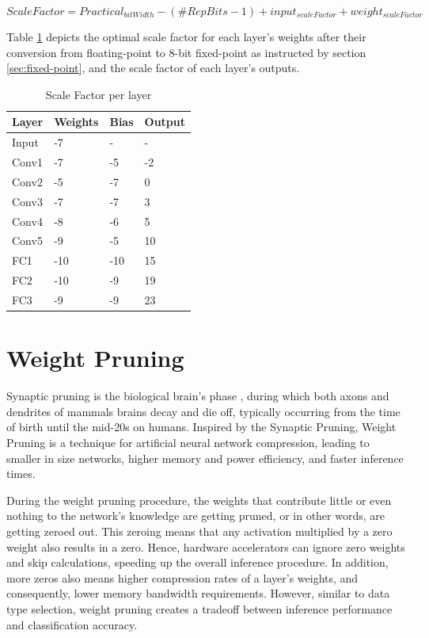 \begin{equation}
	\label{eqn:activations-scale-factor}
	ScaleFactor = Practical_{bitWidth} - (\#RepBits - 1) + input_{scaleFactor} + weight_{scaleFactor}
\end{equation}

Table \ref{tab:Scale-Factor-per-layer} depicts the optimal scale factor for each layer's weights after their conversion from floating-point to 8-bit fixed-point as instructed by section \ref{sec:fixed-point}, and the scale factor of each layer's outputs.

\begin{table}[H]
	\caption{Scale Factor per layer}
	\label{tab:Scale-Factor-per-layer}
	\centering
	\begin{tabular}{llll}
		\toprule
		\textbf{Layer} & \textbf{Weights} & \textbf{Bias} & \textbf{Output}\\
		\midrule
			Input & -7 & - & -\\
			Conv1 & -7 & -5 & -2\\
			Conv2 & -5 & -7 & 0\\
			Conv3 & -7 & -7 & 3\\
			Conv4 & -8 & -6 & 5\\
			Conv5 & -9 & -5 & 10\\
			FC1 & -10 & -10 & 15\\
			FC2 & -10 & -9 & 19\\
			FC3 & -9 & -9 & 23\\
		\bottomrule
	\end{tabular}
\end{table}

\section{Weight Pruning}
Synaptic pruning is the biological brain's phase \cite{Synaptic-Pruning-Wikipedia}, during which both axons and dendrites of mammals brains decay and die off, typically occurring from the time of birth until the mid-20s on humans. Inspired by the Synaptic Pruning, Weight Pruning is a technique for artificial neural network compression, leading to smaller in size networks, higher memory and power efficiency, and faster inference times.

During the weight pruning procedure, the weights that contribute little or even nothing to the network's knowledge are getting pruned, or in other words, are getting zeroed out. This zeroing means that any activation multiplied by a zero weight also results in a zero. Hence, hardware accelerators can ignore zero weights and skip calculations, speeding up the overall inference procedure. In addition, more zeros also means higher compression rates of a layer's weights, and consequently, lower memory bandwidth requirements. However, similar to data type selection, weight pruning creates a tradeoff between inference performance and classification accuracy.

